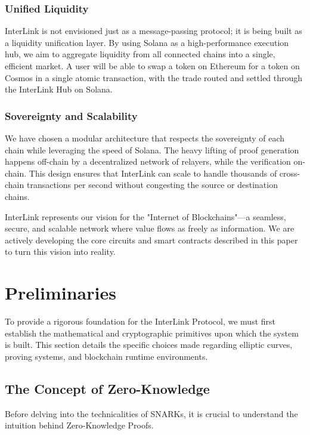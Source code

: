\documentclass[11pt,a4paper]{article}
\begin{document}
\subsubsection{Unified Liquidity}
InterLink is not envisioned just as a message-passing protocol; it is being built as a liquidity unification layer. By using Solana as a high-performance execution hub, we aim to aggregate liquidity from all connected chains into a single, efficient market. A user will be able to swap a token on Ethereum for a token on Cosmos in a single atomic transaction, with the trade routed and settled through the InterLink Hub on Solana.

\subsubsection{Sovereignty and Scalability}
We have chosen a modular architecture that respects the sovereignty of each chain while leveraging the speed of Solana. The heavy lifting of proof generation happens off-chain by a decentralized network of relayers, while the verification on-chain. This design ensures that InterLink can scale to handle thousands of cross-chain transactions per second without congesting the source or destination chains.

InterLink represents our vision for the "Internet of Blockchains"---a seamless, secure, and scalable network where value flows as freely as information. We are actively developing the core circuits and smart contracts described in this paper to turn this vision into reality.

\section{Preliminaries}
\label{sec:prelim}

To provide a rigorous foundation for the InterLink Protocol, we must first establish the mathematical and cryptographic primitives upon which the system is built. This section details the specific choices made regarding elliptic curves, proving systems, and blockchain runtime environments.

\subsection{The Concept of Zero-Knowledge}
Before delving into the technicalities of SNARKs, it is crucial to understand the intuition behind Zero-Knowledge Proofs.
\end{document}
